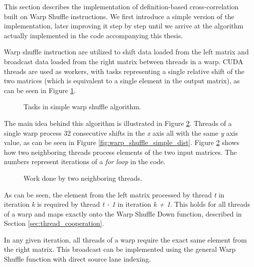 This section describes the implementation of definition-based cross-correlation built on Warp Shuffle instructions. We first introduce a simple version of the implementation, later improving it step by step until we arrive at the algorithm actually implemented in the code accompanying this thesis.

Warp shuffle instruction are utilized to shift data loaded from the left matrix and broadcast data loaded from the right matrix between threads in a warp. CUDA threads are used as workers, with tasks representing a single relative shift of the two matrices (which is equivalent to a single element in the output matrix), as can be seen in Figure \ref{fig:warp_shuffle_simple_tasks}.

\begin{figure}[h]
	\centering
	\def\svgwidth{0.8\textwidth}
	
	\caption{Tasks in simple warp shuffle algorithm.}
	\label{fig:warp_shuffle_simple_tasks}
\end{figure}

The main idea behind this algorithm is illustrated in Figure \ref{fig:warp_shuffle_shuffle}. Threads of a single warp process 32 consecutive shifts in the \textit{x} axis all with the same \textit{y} axis value, as can be seen in Figure \ref{fig:warp_shuffle_simple_dist}. Figure \ref{fig:warp_shuffle_shuffle} shows how two neighboring threads process elements of the two input matrices. The numbers represent iterations of a \textit{for loop} in the code. 

\begin{figure}[h]
	\centering
	\def\svgwidth{0.8\textwidth}
	
	\caption{Work done by two neighboring threads.}
	\label{fig:warp_shuffle_shuffle}
\end{figure}

As can be seen, the element from the left matrix processed by thread \textit{t} in iteration \textit{k} is required by thread \textit{t - 1} in iteration \textit{k + 1}. This holds for all threads of a warp and maps exactly onto the Warp Shuffle Down function, described in Section \ref{sec:thread_cooperation}. 


In any given iteration, all threads of a warp require the exact same element
from the right matrix. This broadcast can be implemented using the general Warp Shuffle function with direct source lane indexing.

